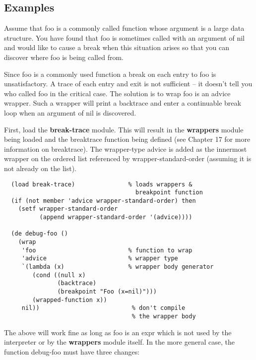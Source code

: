 \subsection{Examples}

  Assume that foo is a commonly called function  whose  argument
is a large data structure.  You have found that foo is sometimes
called  with  an argument of nil and would like to cause a break
when this situation arises so that you can discover where foo is
being called from.

  Since foo is a commonly used function a break on each entry to
foo is unsatisfactory.  A trace of each entry and  exit  is  not
sufficient  --    it  doesn't  tell  you  who  called foo in the
critical case.  The  solution  is  to  wrap  foo  is  an  advice
wrapper.    Such  a  wrapper  will print a backtrace and enter a
continuable break loop when an argument of nil is discovered.

  First, load the {\bf break-trace} module.  This will result  in  the
{\bf wrappers} module  being loaded and the breaktrace function being
defined (see Chapter 17 for  more  information  on  breaktrace).
The wrapper-type advice is added as the innermost wrapper on the
ordered  list  referenced by wrapper-standard-order (assuming it
is not already on the list).

\begin{verbatim}
  (load break-trace)               % loads wrappers & 
                                     breakpoint function
  (if (not member 'advice wrapper-standard-order) then
    (setf wrapper-standard-order
          (append wrapper-standard-order '(advice))))

  (de debug-foo ()
    (wrap
     'foo                          % function to wrap
     'advice                       % wrapper type
     `(lambda (x)                  % wrapper body generator
        (cond ((null x)
               (backtrace)
               (breakpoint "Foo (x=nil)")))
        (wrapped-function x))
     nil))                          % don't compile 
                                    % the wrapper body
\end{verbatim}
  The  above  will  work fine as long as foo is an expr which is
not used by the interpreter or by the {\bf wrappers} module itself.
In the more general case, the function debug-foo must have three
changes:


